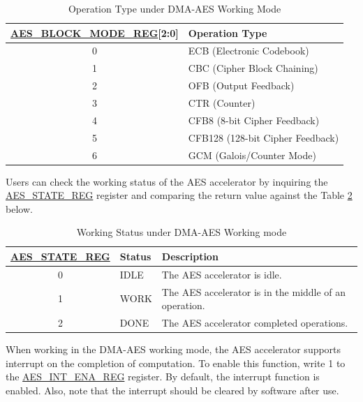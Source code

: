 \documentclass[main\_\_EN.tex]{subfiles}
\begin{document}
\begin{longtable}[c]{ | c | l | }
\caption{Operation Type under DMA-AES Working Mode}
\label{table:AESBlockMode}
\\\hline
\rowcolor{lightgray}
\hyperref[regdesc:AESBLOCKMODEREG]{AES\_BLOCK\_MODE\_REG}[2:0]     & Operation Type\\
    \hline
    0                          & ECB (Electronic Codebook)    \\
    \hline
    1                          & CBC (Cipher Block Chaining)     \\
    \hline
    2                          & OFB (Output Feedback)    \\
    \hline
    3                          & CTR (Counter)    \\
    \hline
    4                          & CFB8 (8-bit Cipher Feedback)    \\
    \hline
    5                          & CFB128 (128-bit Cipher Feedback) \\
    \hline
    6                          & GCM (Galois/Counter Mode)     \\
    \hline
\end{longtable}

Users can check the working status of the AES accelerator by inquiring the \hyperref[regdesc:AESSTATEREG]{AES\_STATE\_REG} register and comparing the return value against the Table \ref{table:AESStateValue-dma} below.

\begin{longtable}[c]{ | c | l | l | }
\caption{Working Status under DMA-AES Working mode}
\label{table:AESStateValue-dma}
\\\hline
\rowcolor{lightgray}
\hyperref[regdesc:AESSTATEREG]{AES\_STATE\_REG} & Status &  Description \\ \hline

    0                   & IDLE      &   The AES accelerator is idle.\\ \hline
    1                   & WORK      &   The AES accelerator is in the middle of an operation.     \\ \hline
    2                   & DONE      &   The AES accelerator completed operations.     \\ \hline
\end{longtable}

When working in the DMA-AES working mode, the AES accelerator supports interrupt on the completion of computation. To enable this function, write 1 to the \hyperref[regdesc:AESINTENAREG]{AES\_INT\_ENA\_REG} register. By default, the interrupt function is enabled. Also, note that the interrupt should be cleared by software after use.
\end{document}
